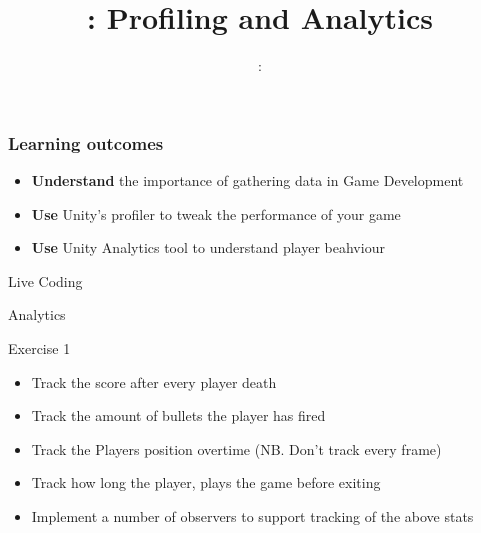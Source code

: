 \usepackage{../../beamerthemeFalmouthGamesAcademy}
\usepackage{multimedia}
\graphicspath{ {../../} }


\usepackage[normalem]{ulem}
\usepackage{wasysym}

\usepackage{pdfpages}

\usetikzlibrary{arrows,automata}




\title{\sessionnumber: Profiling and Analytics}
\subtitle{\modulecode: \moduletitle}

\frame{\titlepage} 

\begin{frame}
	\frametitle{Learning outcomes}
	\begin{itemize}
		\item \textbf{Understand} the importance of gathering data in Game Development
		\item \textbf{Use} Unity's profiler to tweak the performance of your game
		\item \textbf{Use} Unity Analytics tool to understand player beahviour
	\end{itemize}
\end{frame}

\begin{frame}{Live Coding}
	\begin{center}
	Analytics
	\end{center}
\end{frame}

\begin{frame}{Exercise 1}
	\begin{itemize}
		\item Track the score after every player death
		\item Track the amount of bullets the player has fired
		\item Track the Players position overtime (NB. Don't track every frame)
		\item Track how long the player, plays the game before exiting
		\item Implement a number of observers to support tracking of the above stats
	\end{itemize}
\end{frame}

